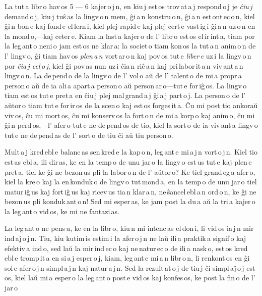 \documentclass[ngerman,12pt,twoside]{book}
\begin{document}
La tut\,a libr\,o hav\,os 5 --- 6 kajer\,o\,j\,n, en kiu\,j est\,os trov\,at\,a\,j respond\,o\,j je \emph{ĉiu\,j} demand\,o\,j, kiu\,j tuŝ\,as la lingv\,o\,n mem, ĝi\,a\,n konstru\,o\,n, ĝi\,a\,n est\,ont\,ec\,o\,n, kiel ĝi\,n bon\,e kaj fond\,e el\,lern\,i, kiel plej rapid\,e kaj plej cert\,e vast\,ig\,i ĝi\,a\,n uz\,o\,n en la mond\,o,---kaj ceter\,e. Kiam la last\,a kajer\,o de l' libr\,o est\,os el\,ir\,int\,a, tiam por la leg\,ant\,o neni\,o jam est\,os ne klar\,a: la societ\,o tiam kon\,os la tut\,a\,n anim\,o\,n de l' lingv\,o, ĝi tiam hav\,os \emph{plen\,a\,n} vort\,ar\,o\,n kaj pov\,os tut\,e \emph{liber\,e} uz\,i la lingv\,o\,n por \emph{ĉia\,j cel\,o\,j}, kiel ĝi pov\,as nun uz\,i ĉia\,n riĉ\,a\,n kaj pri\,labor\,it\,a\,n viv\,ant\,a\,n lingv\,o\,n. La de\,pend\,o de la lingv\,o de l' vol\,o aŭ de l' talent\,o de mi\,a propr\,a person\,o aŭ de ia ali\,a apart\,a person\,o aŭ person\,ar\,o---tut\,e for\,iĝ\,os. La lingv\,o tiam est\,os tut\,e pret\,a en ĉiu\,j plej mal\,grand\,a\,j ĝi\,a\,j part\,o\,j. La person\,o de l' aŭtor\,o tiam tut\,e for\,ir\,os de la scen\,o kaj est\,os forges\,it\,a. Ĉu mi post tio ankoraŭ viv\,os, ĉu mi mort\,os, ĉu mi konserv\,os la fort\,o\,n de mi\,a korp\,o kaj anim\,o, ĉu mi ĝi\,n perd\,os,---l' afer\,o tut\,e ne de\,pend\,os de tio, kiel la sort\,o de ia viv\,ant\,a lingv\,o tut\,e ne de\,pend\,as de l' sort\,o de tiu ĉi aŭ tiu person\,o.

Mult\,a\,j kred\,ebl\,e balanc\,as sen\,kred\,e la kap\,o\,n, leg\,ant\,e mi\,a\,j\,n vort\,o\,j\,n. Kiel tio est\,as ebl\,a, ili dir\,as, ke en la temp\,o de unu jar\,o la lingv\,o est\,us tut\,e kaj plen\,e pret\,a, tiel ke ĝi ne bezon\,us pli la labor\,o\,n de l' aŭtor\,o? Ke tiel grand\,eg\,a afer\,o, kiel la kre\,o kaj la en\,konduk\,o de lingv\,o tut\,mond\,a, en la temp\,o de unu jar\,o tiel matur\,iĝ\,us kaj fort\,iĝ\,us kaj ricev\,us tia\,n klar\,a\,n, ne\,ŝancel\,ebl\,a\,n ord\,o\,n, ke ĝi ne bezon\,us pli konduk\,ant\,o\,n! Sed mi esper\,as, ke jam post la du\,a aŭ la tri\,a kajer\,o la leg\,ant\,o vid\,os, ke mi ne fantazi\,as.

La leg\,ant\,o ne pens\,u, ke en la libr\,o, kiu\,n mi intenc\,as el\,don\,i, li vid\,os ia\,j\,n mir\,ind\,aĵ\,o\,j\,n. Tiu, kiu kutim\,is estim\,i la afer\,o\,j\,n ne laŭ ili\,a praktik\,a signif\,o kaj efektiv\,a ind\,o, sed laŭ la mir\,ind\,ec\,o kaj ne\,natur\,ec\,o de ili\,a nask\,o, est\,os kred\,ebl\,e tromp\,it\,a en si\,a\,j esper\,o\,j, kiam, leg\,ant\,e mi\,a\,n libr\,o\,n, li renkont\,os en ĝi sol\,e afer\,o\,j\,n simpl\,a\,j\,n kaj natur\,a\,j\,n. Sed la rezult\,at\,o\,j de tiu\,j ĉi simpl\,aĵ\,o\,j est\,os, kiel laŭ mi\,a esper\,o la leg\,ant\,o post\,e vid\,os kaj konfes\,os, ke post la fin\,o de l' jar\,o
\end{document}

